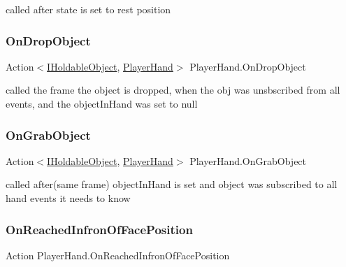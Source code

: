 called after state is set to rest position 

\mbox{\label{class_player_hand_ac22e288fe18167393a51eec5ad0cbfc0}} 
\subsubsection{\texorpdfstring{On\+Drop\+Object}{OnDropObject}}
{\footnotesize\ttfamily Action$<$\mbox{\hyperlink{interface_i_holdable_object}{I\+Holdable\+Object}}, \mbox{\hyperlink{class_player_hand}{Player\+Hand}}$>$ Player\+Hand.\+On\+Drop\+Object}



called the frame the object is dropped, when the obj was unsbscribed from all events, and the object\+In\+Hand was set to null 

\mbox{\label{class_player_hand_af3875f350ce765612b5af99e8e9d5837}} 
\subsubsection{\texorpdfstring{On\+Grab\+Object}{OnGrabObject}}
{\footnotesize\ttfamily Action$<$\mbox{\hyperlink{interface_i_holdable_object}{I\+Holdable\+Object}}, \mbox{\hyperlink{class_player_hand}{Player\+Hand}}$>$ Player\+Hand.\+On\+Grab\+Object}



called after(same frame) object\+In\+Hand is set and object was subscribed to all hand events it needs to know 

\mbox{\label{class_player_hand_a9f27078422ba536d94e6fb76e093cf7c}} 
\subsubsection{\texorpdfstring{On\+Reached\+Infron\+Of\+Face\+Position}{OnReachedInfronOfFacePosition}}
{\footnotesize\ttfamily Action Player\+Hand.\+On\+Reached\+Infron\+Of\+Face\+Position}



